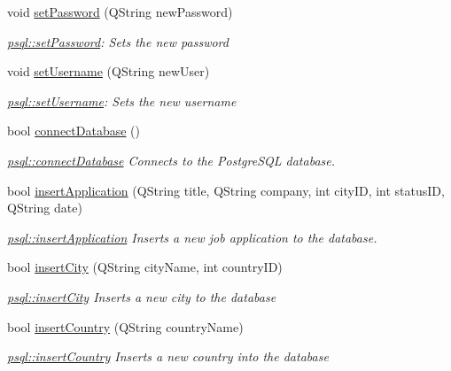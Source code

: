 \begin{DoxyCompactItemize}
void \hyperlink{classpsql_a6c29350037550b7e5a5bb8f439c405f3}{set\+Password} (Q\+String new\+Password)
\begin{DoxyCompactList}\small\item\em \hyperlink{classpsql_a6c29350037550b7e5a5bb8f439c405f3}{psql\+::set\+Password}\+: Sets the new password \end{DoxyCompactList}\item 
void \hyperlink{classpsql_a1488a9e4909abd172651b7be240342cb}{set\+Username} (Q\+String new\+User)
\begin{DoxyCompactList}\small\item\em \hyperlink{classpsql_a1488a9e4909abd172651b7be240342cb}{psql\+::set\+Username}\+: Sets the new username \end{DoxyCompactList}\item 
bool \hyperlink{classpsql_ada485c933df77453629e3821ab19fa4c}{connect\+Database} ()
\begin{DoxyCompactList}\small\item\em \hyperlink{classpsql_ada485c933df77453629e3821ab19fa4c}{psql\+::connect\+Database} Connects to the Postgre\+S\+QL database. \end{DoxyCompactList}\item 
bool \hyperlink{classpsql_a4073d4f70f2ae6211ba0328c2008407c}{insert\+Application} (Q\+String title, Q\+String company, int city\+ID, int status\+ID, Q\+String date)
\begin{DoxyCompactList}\small\item\em \hyperlink{classpsql_a4073d4f70f2ae6211ba0328c2008407c}{psql\+::insert\+Application} Inserts a new job application to the database. \end{DoxyCompactList}\item 
bool \hyperlink{classpsql_a767b85014d9df3eac148730f18888d6d}{insert\+City} (Q\+String city\+Name, int country\+ID)
\begin{DoxyCompactList}\small\item\em \hyperlink{classpsql_a767b85014d9df3eac148730f18888d6d}{psql\+::insert\+City} Inserts a new city to the database \end{DoxyCompactList}\item 
bool \hyperlink{classpsql_ab3b5934ce3fbc4be1730d990d4142893}{insert\+Country} (Q\+String country\+Name)
\begin{DoxyCompactList}\small\item\em \hyperlink{classpsql_ab3b5934ce3fbc4be1730d990d4142893}{psql\+::insert\+Country} Inserts a new country into the database \end{DoxyCompactList}\item 

\end{DoxyCompactItemize}
